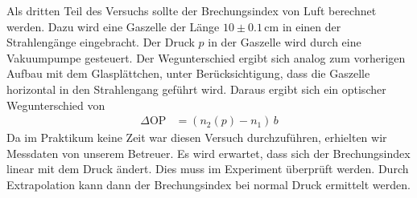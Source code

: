 Als dritten Teil des Versuchs sollte der Brechungsindex von Luft berechnet werden. Dazu wird eine Gaszelle der Länge $10\pm0.1\,$cm in einen der Strahlengänge eingebracht. Der Druck $p$ in der Gaszelle wird durch eine Vakuumpumpe gesteuert. Der Wegunterschied ergibt sich analog zum vorherigen Aufbau mit dem Glasplättchen, unter Berücksichtigung, dass die Gaszelle horizontal in den Strahlengang geführt wird. Daraus ergibt sich ein optischer Wegunterschied von
\begin{align*}
    \Delta \text{OP}&=(n_2(p)-n_1)\,b
\end{align*}
Da im Praktikum keine Zeit war diesen Versuch durchzuführen, erhielten wir Messdaten von unserem Betreuer. Es wird erwartet, dass sich der Brechungsindex linear mit dem Druck ändert. Dies muss im Experiment überprüft werden. Durch Extrapolation kann dann der Brechungsindex bei normal Druck ermittelt werden.